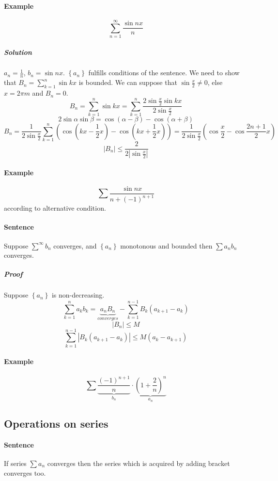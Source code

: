 \paragraph{Example}
$$\sum_{n=1}^{\infty} \frac{\sin nx}{n}$$
\subparagraph{Solution}
$a_n = \frac{1}{n}$, $b_n = \sin nx$.
$\left\{a_n\right\}$ fulfills conditions of the sentence. We need to show that $B_n = \sum_{k=1}^n \sin kx$ is bounded. We can suppose that $\sin \frac{x}{2} \neq 0$, else $x = 2\pi m$ and $B_n = 0$.
$$B_n = \sum_{k=1}^n \sin kx = \sum_{k=1}^n \frac{2\sin \frac{x}{2} \sin kx}{2\sin \frac{x}{2}}$$
$$2\sin \alpha \sin \beta = \cos \left(\alpha - \beta \right) -  \cos \left(\alpha + \beta \right)$$
$$B_n =  \frac{1}{2\sin \frac{x}{2}} \sum_{k=1}^n \left( \cos \left(kx-\frac{1}{2}x\right) - \cos \left(kx+\frac{1}{2}x\right) \right) = \frac{1}{2\sin \frac{x}{2}} \left(\cos \frac{x}{2} - \cos \frac{2n+1}{2}x\right)$$
$$|B_n| \leq \frac{2}{2\left|\sin \frac{x}{2}\right|}$$
\paragraph{Example}
$$\sum \frac{\sin nx}{n+\left(-1\right)^{n+1}}$$ according to alternative condition.
\paragraph{Sentence}
Suppose $\sum^{\infty} b_n$ converges, and $\left\{a_n\right\}$ monotonous and bounded then $\sum a_nb_n$ converges.
\subparagraph{Proof}
Suppose $\left\{a_n\right\}$ is non-decreasing.
$$\sum_{k=1}^n a_kb_k = \underbrace{a_nB_n}_{converges}-\sum_{k=1}^{n-1} B_k\left(a_{k+1}-a_k\right)$$
$$|B_n| \leq M$$
$$\sum_{k=1}^{n-1} \left|B_k\left(a_{k+1}-a_k\right)\right| \leq M(a_{k}-a_{k+1})$$
\paragraph{Example}
$$\sum \underbrace{\frac{\left(-1\right)^{n+1}}{n}}_{b_n} \cdot \underbrace{\left(1+\frac{2}{n}\right)^n}_{a_n}$$
\subsection{Operations on series}
\paragraph{Sentence}
If series $\sum a_n$ converges then the series which is acquired by adding bracket converges too.
